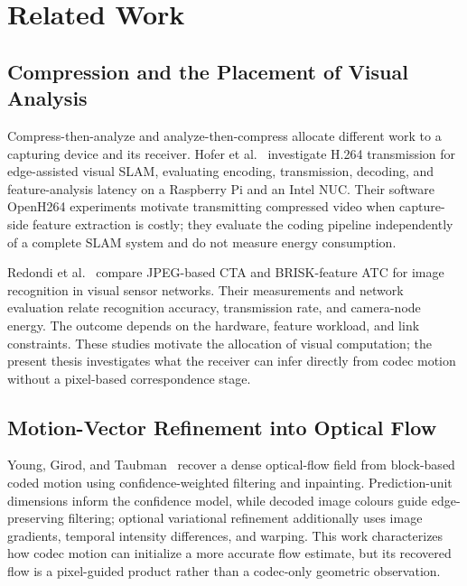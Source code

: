 
\chapter{Related Work}\label{chapter:related-work}

\section{Compression and the Placement of Visual Analysis}

Compress-then-analyze and analyze-then-compress allocate different work to a
capturing device and its receiver. Hofer et al.~\cite{hofer2023h264cta}
investigate H.264 transmission for edge-assisted visual SLAM, evaluating
encoding, transmission, decoding, and feature-analysis latency on a Raspberry
Pi and an Intel NUC. Their software OpenH264 experiments motivate transmitting
compressed video when capture-side feature extraction is costly; they evaluate
the coding pipeline independently of a complete SLAM system and do not measure
energy consumption.

Redondi et al.~\cite{redondi2016cta} compare JPEG-based CTA and BRISK-feature ATC
for image recognition in visual sensor networks. Their measurements and network
evaluation relate recognition accuracy, transmission rate, and camera-node
energy. The outcome depends on the hardware, feature workload, and link
constraints. These studies motivate the allocation of visual computation; the
present thesis investigates what the receiver can infer directly from codec
motion without a pixel-based correspondence stage.

\section{Motion-Vector Refinement into Optical Flow}

Young, Girod, and Taubman~\cite{young2020fast} recover a dense optical-flow field from block-based coded motion using confidence-weighted filtering and inpainting. Prediction-unit dimensions inform the confidence model, while decoded image colours guide edge-preserving filtering; optional variational refinement additionally uses image gradients, temporal intensity differences, and warping. This work characterizes how codec motion can initialize a more accurate flow estimate, but its recovered flow is a pixel-guided product rather than a codec-only geometric observation.

